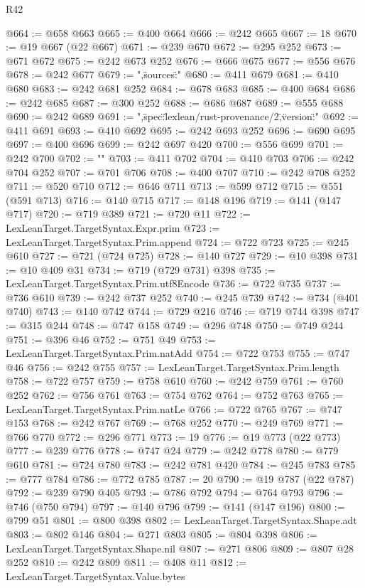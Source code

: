 \begin{lexlean}{R42}
\begin{coremodule}
{@664 := @658 @663
@665 := @400 @664
@666 := @242 @665
@667 := 18
@670 := @19 @667 (@22 @667)
@671 := @239 @670
@672 := @295 @252
@673 := @671 @672
@675 := @242 @673 @252
@676 := @666 @675
@677 := @556 @676
@678 := @242 @677
@679 := ",\"sources\":"
@680 := @411 @679
@681 := @410 @680
@683 := @242 @681 @252
@684 := @678 @683
@685 := @400 @684
@686 := @242 @685
@687 := @300 @252
@688 := @686 @687
@689 := @555 @688
@690 := @242 @689
@691 := ",\"spec\":\"lexlean/rust-provenance/2\",\"version\":"
@692 := @411 @691
@693 := @410 @692
@695 := @242 @693 @252
@696 := @690 @695
@697 := @400 @696
@699 := @242 @697 @420
@700 := @556 @699
@701 := @242 @700
@702 := "}\n"
@703 := @411 @702
@704 := @410 @703
@706 := @242 @704 @252
@707 := @701 @706
@708 := @400 @707
@710 := @242 @708 @252
@711 := @520 @710
@712 := @646 @711
@713 := @599 @712
@715 := @551 (@591 @713)
@716 := @140 @715
@717 := @148 @196
@719 := @141 (@147 @717)
@720 := @719 @389
@721 := @720 @11
@722 := LexLeanTarget.TargetSyntax.Expr.prim
@723 := LexLeanTarget.TargetSyntax.Prim.append
@724 := @722 @723
@725 := @245 @610
@727 := @721 (@724 @725)
@728 := @140 @727
@729 := @10 @398
@731 := @10 @409 @31
@734 := @719 (@729 @731) @398
@735 := LexLeanTarget.TargetSyntax.Prim.utf8Encode
@736 := @722 @735
@737 := @736 @610
@739 := @242 @737 @252
@740 := @245 @739
@742 := @734 (@401 @740)
@743 := @140 @742
@744 := @729 @216
@746 := @719 @744 @398
@747 := @315 @244
@748 := @747 @158
@749 := @296 @748
@750 := @749 @244
@751 := @396 @46
@752 := @751 @49
@753 := LexLeanTarget.TargetSyntax.Prim.natAdd
@754 := @722 @753
@755 := @747 @46
@756 := @242 @755
@757 := LexLeanTarget.TargetSyntax.Prim.length
@758 := @722 @757
@759 := @758 @610
@760 := @242 @759
@761 := @760 @252
@762 := @756 @761
@763 := @754 @762
@764 := @752 @763
@765 := LexLeanTarget.TargetSyntax.Prim.natLe
@766 := @722 @765
@767 := @747 @153
@768 := @242 @767
@769 := @768 @252
@770 := @249 @769
@771 := @766 @770
@772 := @296 @771
@773 := 19
@776 := @19 @773 (@22 @773)
@777 := @239 @776
@778 := @747 @24
@779 := @242 @778
@780 := @779 @610
@781 := @724 @780
@783 := @242 @781 @420
@784 := @245 @783
@785 := @777 @784
@786 := @772 @785
@787 := 20
@790 := @19 @787 (@22 @787)
@792 := @239 @790 @405
@793 := @786 @792
@794 := @764 @793
@796 := @746 (@750 @794)
@797 := @140 @796
@799 := @141 (@147 @196)
@800 := @799 @51
@801 := @800 @398
@802 := LexLeanTarget.TargetSyntax.Shape.adt
@803 := @802 @146
@804 := @271 @803
@805 := @804 @398
@806 := LexLeanTarget.TargetSyntax.Shape.nil
@807 := @271 @806
@809 := @807 @28 @252
@810 := @242 @809
@811 := @408 @11
@812 := LexLeanTarget.TargetSyntax.Value.bytes

\end{coremodule}
\end{lexlean}
